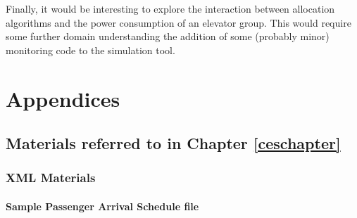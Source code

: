 \documentclass{UoYCSproject}
\begin{document}
Finally, it would be interesting to explore the interaction between allocation algorithms and the power consumption of an elevator group.  This would require some further domain understanding the addition  of some (probably minor) monitoring code to the simulation tool.



\appendix
\part{Appendices}

\chapter{Materials referred to in Chapter \ref{ceschapter}}

\section{XML Materials}

\subsection{Sample Passenger Arrival Schedule file}
\end{document}
